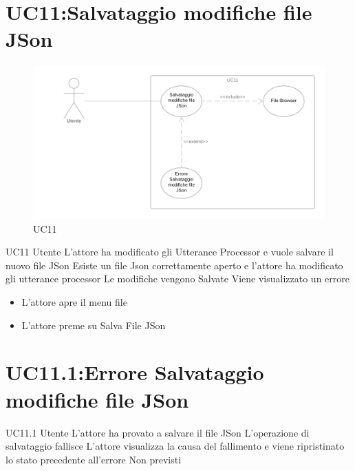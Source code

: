 \documentclass[../AnalisideiRequisiti.tex]{subfiles}
\begin{document}
\section{UC11:Salvataggio modifiche file JSon}
\begin{figure}[H]
	\caption{UC11}
	\centering
	\includegraphics[width=\textwidth]{../img/UC11.png}
\end{figure}
\UserCase
{UC11}
{Utente}
{}
{L'attore ha modificato gli Utterance Processor e vuole salvare il nuovo file JSon}
{Esiste un file Json correttamente aperto  e l'attore ha modificato gli utterance processor }
{Le modifiche vengono Salvate}
{Viene visualizzato un errore }
{\begin{itemize}
		\item{} L'attore apre il menu file 
		\item{} L'attore preme su Salva File JSon
\end{itemize}
}
\section{UC11.1:Errore Salvataggio modifiche file JSon}
\UserCase
{UC11.1}
{Utente}
{}
{L'attore ha provato a salvare il file JSon}
{L'operazione di salvataggio fallisce }
{L'attore visualizza la causa del fallimento e viene ripristinato lo stato precedente all'errore}
{Non previsti}
{}
\end{document}
